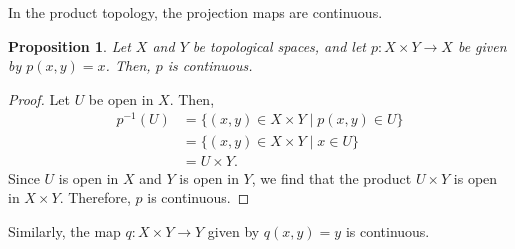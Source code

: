 \documentclass[a4paper, openany]{memoir}
\theoremstyle{definition}
\theoremstyle{plain}
\newtheorem{proposition}[definition]{Proposition}
\begin{document}
In the product topology, the projection maps are continuous.
\begin{proposition}
Let $X$ and $Y$ be topological spaces, and let $p: X \times Y \to X$ be given by $p(x, y) = x$. Then, $p$ is continuous.
\end{proposition}
\begin{proof}
Let $U$ be open in $X$. Then,
\begin{align*}
    p^{-1}(U) &= \{(x, y) \in X \times Y \mid p(x, y) \in U\} \\
    &= \{(x, y) \in X \times Y \mid x \in U\} \\
    &= U \times Y.
\end{align*}
Since $U$ is open in $X$ and $Y$ is open in $Y$, we find that the product $U \times Y$ is open in $X \times Y$. Therefore, $p$ is continuous.
\end{proof}
\noindent Similarly, the map $q: X \times Y \to Y$ given by $q(x, y) = y$ is continuous.
\end{document}
